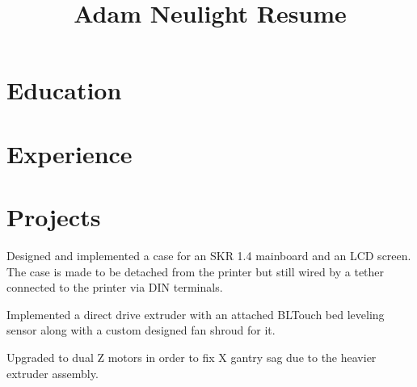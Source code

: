 \documentclass[a4paper]{comcv}
\title{Adam Neulight Resume}
\begin{document}

\section{Education}


\section{Experience}




\section{Projects}


\smallskip
    \begin{tightlist}
        \item Designed and implemented a case for an SKR 1.4 mainboard and an LCD screen. The case is made to be detached from the printer but still wired by a tether connected to the printer via DIN terminals.
        \item Implemented a direct drive extruder with an attached BLTouch bed leveling sensor along with a custom designed fan shroud for it.
        \item Upgraded to dual Z motors in order to fix X gantry sag due to the heavier extruder assembly.
\end{tightlist}
\end{document}
